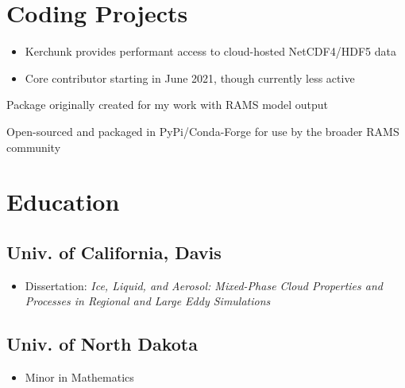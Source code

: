 \documentclass[]{deedy-resume-reversed}
\begin{document}
\hfill
\begin{minipage}[t]{0.33\textwidth}


\section{Coding Projects}
\begin{itemize}
\item Kerchunk provides performant access to cloud-hosted NetCDF4/HDF5 data
\item Core contributor starting in June 2021, though currently less active
\end{itemize}
\sectionsep

\begin{tightemize}
\item Package originally created for my work with RAMS model output
\item Open-sourced and packaged in PyPi/Conda-Forge for use by the broader RAMS community 
\end{tightemize}
\sectionsep



\section{Education}

\subsection{Univ. of California, Davis}
\begin{itemize}
    \item Dissertation: \textit{Ice, Liquid, and Aerosol: Mixed-Phase Cloud Properties and Processes in Regional and Large Eddy Simulations}   
\end{itemize}
\sectionsep
\subsection{Univ. of North Dakota}
\begin{itemize}
    \item Minor in Mathematics
\end{itemize}


\end{minipage}
\end{document}
